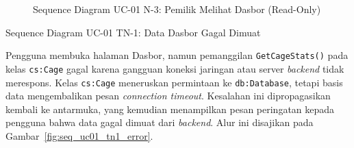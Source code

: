 \begin{figure}[htbp]
\centering
{}
\caption{Sequence Diagram UC-01 N-3: Pemilik Melihat Dasbor (Read-Only)}
\label{fig:seq_uc01_n3_pemilik}
\end{figure}

\newpage

\item{Sequence Diagram UC-01 TN-1: Data Dasbor Gagal Dimuat}

Pengguna membuka halaman Dasbor, namun pemanggilan \texttt{GetCageStats()}
pada kelas \texttt{cs:Cage} gagal karena gangguan koneksi jaringan atau
server \textit{backend} tidak merespons. Kelas \texttt{cs:Cage} meneruskan
permintaan ke \texttt{db:Database}, tetapi basis data mengembalikan pesan
\textit{connection timeout}. Kesalahan ini dipropagasikan kembali ke
antarmuka, yang kemudian menampilkan pesan peringatan kepada pengguna
bahwa data gagal dimuat dari \textit{backend}. Alur ini disajikan pada
Gambar~\ref{fig:seq_uc01_tn1_error}.

